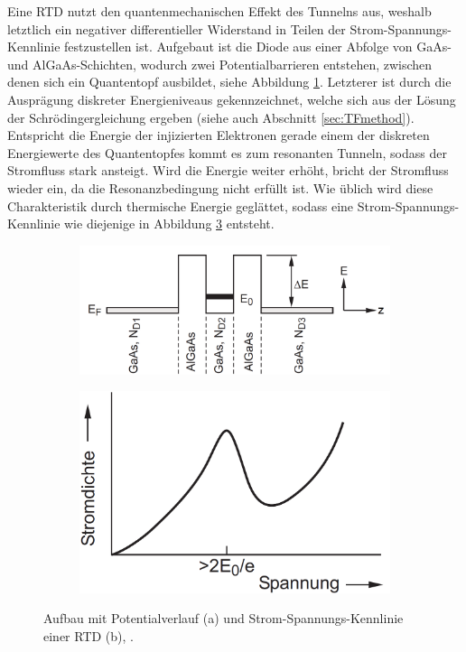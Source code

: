 Eine RTD nutzt den quantenmechanischen Effekt des Tunnelns aus, weshalb letztlich ein negativer differentieller Widerstand in Teilen der Strom-Spannungs-Kennlinie festzustellen ist. Aufgebaut ist die Diode aus einer Abfolge von GaAs- und AlGaAs-Schichten, wodurch zwei Potentialbarrieren entstehen, zwischen denen sich ein Quantentopf ausbildet, siehe Abbildung \ref{fig:Heterostuktur}. Letzterer ist durch die Ausprägung diskreter Energieniveaus gekennzeichnet, welche sich aus der Lösung der Schrödingergleichung ergeben (siehe auch Abschnitt \ref{sec:TFmethod}). Entspricht die Energie der injizierten Elektronen gerade einem der diskreten Energiewerte des Quantentopfes kommt es zum resonanten Tunneln, sodass der Stromfluss stark ansteigt. Wird die Energie weiter erhöht, bricht der Stromfluss wieder ein, da die Resonanzbedingung nicht erfüllt ist. Wie üblich wird diese Charakteristik durch thermische Energie geglättet, sodass eine Strom-Spannungs-Kennlinie wie diejenige in Abbildung \ref{fig:IVkurve} entsteht.
\begin{figure}
    \centering
    \begin{subfigure}[b]{0.55\textwidth}
        \centering
        \includegraphics[width=\textwidth]{files/AlGaAs.png}
        \caption[]{{ }}
        \label{fig:Heterostuktur}
    \end{subfigure}
    \hfill
    \begin{subfigure}[b]{0.4\textwidth}
        \centering
        \includegraphics[width=\textwidth]{files/IVkurve.png}
        \caption[]{{ }}
        \label{fig:IVkurve}
    \end{subfigure}
    \caption[]
    {Aufbau mit Potentialverlauf (a) und Strom-Spannungs-Kennlinie einer RTD (b), \cite{wiedenhaus}.}
\end{figure}
